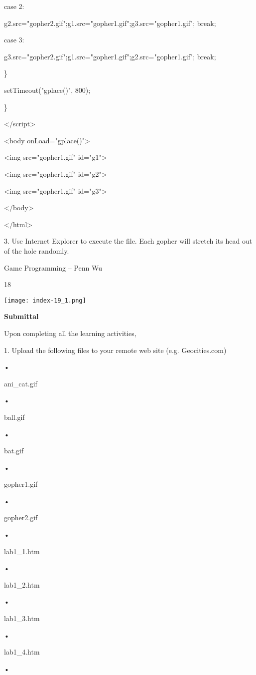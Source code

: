 \documentclass[
]{article}
\begin{document}
case 2:

g2.src="gopher2.gif";g1.src="gopher1.gif";g3.src="gopher1.gif"; break;

case 3:

g3.src="gopher2.gif";g1.src="gopher1.gif";g2.src="gopher1.gif"; break;

\}

setTimeout("gplace()", 800);

\}

\textless/script\textgreater{}

\textless body onLoad="gplace()"\textgreater{}

\textless img src="gopher1.gif" id="g1"\textgreater{}

\textless img src="gopher1.gif" id="g2"\textgreater{}

\textless img src="gopher1.gif" id="g3"\textgreater{}

\textless/body\textgreater{}

\textless/html\textgreater{}

3. Use Internet Explorer to execute the file. Each gopher will stretch
its head out of the hole randomly.

Game Programming -- Penn Wu

18

\protect\hypertarget{index_split_002.htmlux5cux23p19}{}{}\texttt{[image: index-19\_1.png]}

\textbf{Submittal}

Upon completing all the learning activities,

1. Upload the following files to your remote web site (e.g.
Geocities.com)

•

ani\_cat.gif

•

ball.gif

•

bat.gif

•

gopher1.gif

•

gopher2.gif

•

lab1\_1.htm

•

lab1\_2.htm

•

lab1\_3.htm

•

lab1\_4.htm

•
\end{document}
